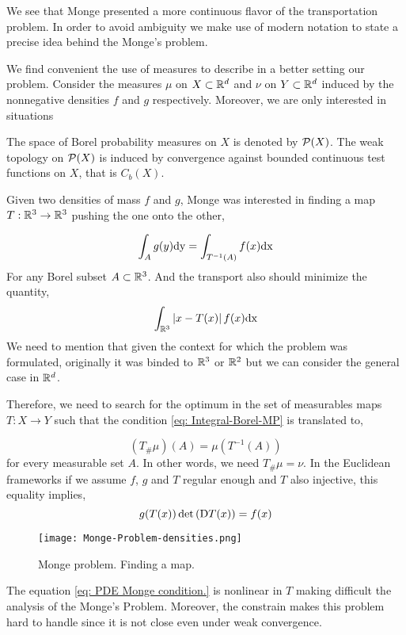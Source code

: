 We see that Monge presented a more continuous flavor of the transportation problem. In order to avoid ambiguity we make use of modern notation to state a precise idea behind the Monge's problem.

We find convenient the use of measures to describe in a better setting our problem. 
Consider the measures $\mu$ on $X \subset \mathbb{R}^d$ and $\nu$ on $Y \subset \mathbb{R}^d$ induced by the nonnegative densities $f$ and $g$ respectively. Moreover, we are only interested in situations 

The space of Borel probability measures on $X$ is denoted by $\mathcal{P}(X)$. The weak topology on $\mathcal{P}(X)$ is induced by convergence against bounded continuous test functions on $X$, that is $C_b(X)$.

Given two densities of mass $f$ and $g$, Monge was interested in finding a map $T:\mathbb{R}^3\rightarrow\mathbb{R}^3$ pushing the one onto the other,

\begin{equation*}
	\int_A g(y) \mathrm{dy} = \int_{T^{-1}(A)} f(x) \mathrm{dx}  \label{eq: Integral-Borel-MP}
\end{equation*}
For any Borel subset $A\subset\mathbb{R}^3$. And the transport also should minimize the quantity, 
\begin{equation*}
	\int_{\mathbb{R}^3} \left| x-T(x) \right| f(x)\mathrm{dx}
\end{equation*}
We need to mention that given the context for which the problem was formulated, originally it was binded to $\mathbb{R}^3$ or $\mathbb{R}^2$ but we can consider the general case in $\mathbb{R}^d$. 


Therefore, we need to search for the optimum in the set of measurables maps $T:X \rightarrow Y$ such that the condition \eqref{eq: Integral-Borel-MP} is translated to,

\begin{equation}
	(T_\#\mu)(A)=\mu(T^{-1}(A))
\end{equation}
for every measurable set $A$. In other words, we need $T_\# \mu = \nu$.  In the Euclidean frameworks if we assume $f$, $g$ and $T$ regular enough and $T$ also injective, this equality implies,
\begin{equation}
	g(T(x))\det\left( \mathrm{D} T(x) \right)=f(x) \label{eq: PDE Monge condition.}
\end{equation} 
\begin{figure}[H]
	\centering
	\caption{Monge problem. Finding a map.}
	\texttt{[image: Monge-Problem-densities.png]}
\end{figure}
The equation \eqref{eq: PDE Monge condition.} is nonlinear in $T$ making difficult the analysis of the Monge's Problem. Moreover, the constrain makes this problem hard to handle since it is not close even under weak convergence. 

